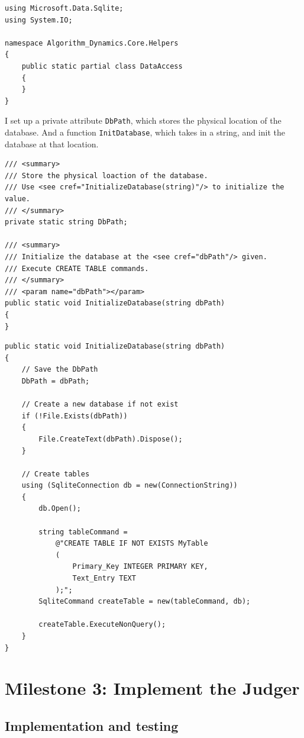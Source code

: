\documentclass[a4paper]{report}
\newcommand{\code}{\texttt}
\begin{document}
\begin{verbatim}
using Microsoft.Data.Sqlite;
using System.IO;

namespace Algorithm_Dynamics.Core.Helpers
{
    public static partial class DataAccess
    {
    }
}
\end{verbatim}

I set up a private attribute \code{DbPath}, which stores the physical location of the database. And a function \code{InitDatabase}, which takes in a string, and init the database at that location.

\begin{verbatim}
/// <summary>
/// Store the physical loaction of the database.
/// Use <see cref="InitializeDatabase(string)"/> to initialize the value.
/// </summary>
private static string DbPath;

/// <summary>
/// Initialize the database at the <see cref="dbPath"/> given.
/// Execute CREATE TABLE commands.
/// </summary>
/// <param name="dbPath"></param>
public static void InitializeDatabase(string dbPath)
{
}
\end{verbatim}



\begin{verbatim}
public static void InitializeDatabase(string dbPath)
{
    // Save the DbPath
    DbPath = dbPath;

    // Create a new database if not exist
    if (!File.Exists(dbPath))
    {
        File.CreateText(dbPath).Dispose();
    }

    // Create tables
    using (SqliteConnection db = new(ConnectionString))
    {
        db.Open();

        string tableCommand =
            @"CREATE TABLE IF NOT EXISTS MyTable 
            (
                Primary_Key INTEGER PRIMARY KEY,
                Text_Entry TEXT
            );";
        SqliteCommand createTable = new(tableCommand, db);

        createTable.ExecuteNonQuery();
    }
}
\end{verbatim}

\section{Milestone 3: Implement the Judger}

\subsection{Implementation and testing}
\end{document}
